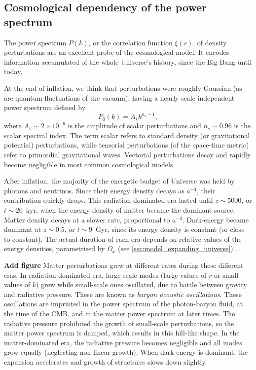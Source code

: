     \subsection{Cosmological dependency of the power spectrum}
    \label{intro:lss:cosmology_dependency}

    The power spectrum $P(k)$, or the correlation function $\xi(r)$, of density 
    perturbations are an excellent probe of the cosmological model. 
    It encodes information accumulated of the whole Universe's history, since the Big Bang
    until today.

    At the end of inflation, we think that perturbations were roughly Gaussian 
    (as are quantum fluctuations of the vacuum), 
    having a nearly scale independent power spectrum defined by
    \begin{equation}
        P_0(k) = A_s k^{n_s-1},
        \label{eq:initial_power_spectrum}
    \end{equation}
    where $A_s \sim 2 \times 10^{-9}$ is the amplitude of scalar perturbations 
    and $n_s \sim 0.96$ is the scalar spectral index. The term scalar refers to 
    standard density (or gravitational potential) perturbations, 
    while tensorial perturbations (of the space-time metric) refer to 
    primordial gravitational waves. Vectorial perturbations decay and rapidly become
    negligible in most common cosmological models. 

    After inflation, the majority of the energetic budget of Universe was held
    by photons and neutrinos. Since their energy density decays as $a^{-4}$, 
    their contribution quickly drops. This radiation-dominated era lasted until 
    $z \sim 5000$, or $t \sim 20$~kyr, when the energy density of matter became 
    the dominant source. Matter density decays at a slower rate, proportional to $a^{-3}$.
    Dark-energy became dominant at $z \sim 0.5$, or $t \sim 9$~Gyr, since its 
    energy density is constant (or close to constant).  
    The actual duration of each era depends on relative values of 
    the energy densities, parametrised by $\Omega_x$ 
    (see \ref{sec:model_expanding_universe}). 

    \textbf{ Add figure}
    Matter perturbations grew at different rates during these different eras.
    In radiation-dominated era, large-scale modes (large values of $r$ 
    or small values of $k$) grew while small-scale ones oscillated,
    due to battle between gravity and radiative pressure. 
    These are known as \emph{baryon acoustic oscillations}. These oscillations
    are imprinted in the power spectrum of the photon-baryon fluid, at the time of the CMB, 
    and in the matter power spectrum at later times. 
    The radiative pressure prohibited the growth of small-scale perturbations,
    so the matter power spectrum is damped, which results in this hill-like shape. 
    In the matter-dominated era, the radiative pressure becomes negligible 
    and all modes grow equally (neglecting non-linear growth). 
    When dark-energy is dominant, the expansion accelerates and 
    growth of structures slows down slightly. 
    
